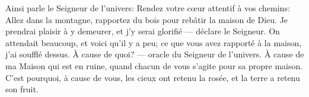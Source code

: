 Ainsi parle le Seigneur de l’univers: Rendez votre cœur attentif à vos chemins:
	Allez dans la montagne, rapportez du bois pour rebâtir la maison de Dieu.
Je prendrai plaisir à y demeurer, et j’y serai glorifié --- déclare le Seigneur.
On attendait beaucoup, et voici qu’il y a peu;
	ce que vous avez rapporté à la maison, j’ai soufflé dessus.
À cause de quoi?
	--- oracle du Seigneur de l’univers.
À cause de ma Maison qui est en ruine,
	quand chacun de vous s’agite pour sa propre maison.
C’est pourquoi, à cause de vous,
	les cieux ont retenu la rosée, et la terre a retenu son fruit.
